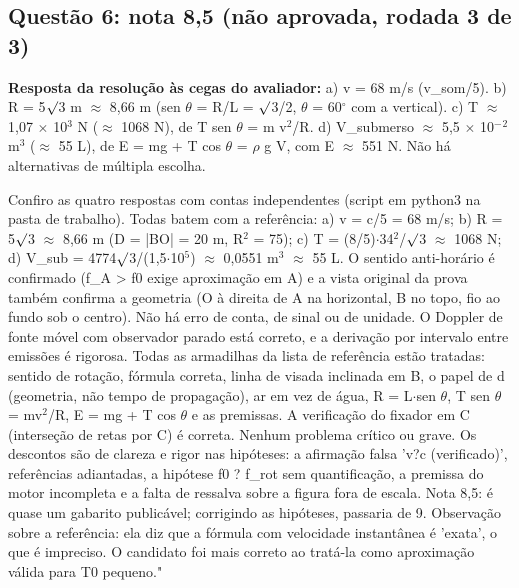 \documentclass{article}%
\begin{document}
\subsection*{Questão 6: nota 8,5 (não aprovada, rodada 3 de 3)}%
\textbf{Resposta da resolução às cegas do avaliador:} a) v = 68 m/s (v\_som/5).\newline%
b) R = 5$\surd$3 m $\approx$ 8,66 m (sen $\theta$ = R/L = $\surd$3/2, $\theta$ = 60$^\circ$ com a vertical).\newline%
c) T $\approx$ 1,07 $\times$ 10$^3$ N ($\approx$ 1068 N), de T sen $\theta$ = m v$^2$/R.\newline%
d) V\_submerso $\approx$ 5,5 $\times$ 10$^{-}$$^2$ m$^3$ ($\approx$ 55 L), de E = mg + T cos $\theta$ = $\rho$ g V, com E $\approx$ 551 N.\newline%
\newline%
Não há alternativas de múltipla escolha.\par %
Confiro as quatro respostas com contas independentes (script em python3 na pasta de trabalho). Todas batem com a referência: a) v = c/5 = 68 m/s; b) R = 5$\surd$3 $\approx$ 8,66 m (D = |BO| = 20 m, R$^2$ = 75); c) T = (8/5)$\cdot$34$^2$/$\surd$3 $\approx$ 1068 N; d) V\_sub = 4774$\surd$3/(1,5$\cdot$10$^{5}$) $\approx$ 0,0551 m$^3$ $\approx$ 55 L. O sentido anti{-}horário é confirmado (f\_A > f0 exige aproximação em A) e a vista original da prova também confirma a geometria (O à direita de A na horizontal, B no topo, fio ao fundo sob o centro). Não há erro de conta, de sinal ou de unidade. O Doppler de fonte móvel com observador parado está correto, e a derivação por intervalo entre emissões é rigorosa. Todas as armadilhas da lista de referência estão tratadas: sentido de rotação, fórmula correta, linha de visada inclinada em B, o papel de d (geometria, não tempo de propagação), ar em vez de água, R = L$\cdot$sen $\theta$, T sen $\theta$ = mv$^2$/R, E = mg + T cos $\theta$ e as premissas. A verificação do fixador em C (interseção de retas por C) é correta. Nenhum problema crítico ou grave. Os descontos são de clareza e rigor nas hipóteses: a afirmação falsa 'v?c (verificado)', referências adiantadas, a hipótese f0 ? f\_rot sem quantificação, a premissa do motor incompleta e a falta de ressalva sobre a figura fora de escala. Nota 8,5: é quase um gabarito publicável; corrigindo as hipóteses, passaria de 9. Observação sobre a referência: ela diz que a fórmula com velocidade instantânea é 'exata', o que é impreciso. O candidato foi mais correto ao tratá{-}la como aproximação válida para T0 pequeno."%
\begin{itemize}%

\end{itemize}$$
\end{document}
